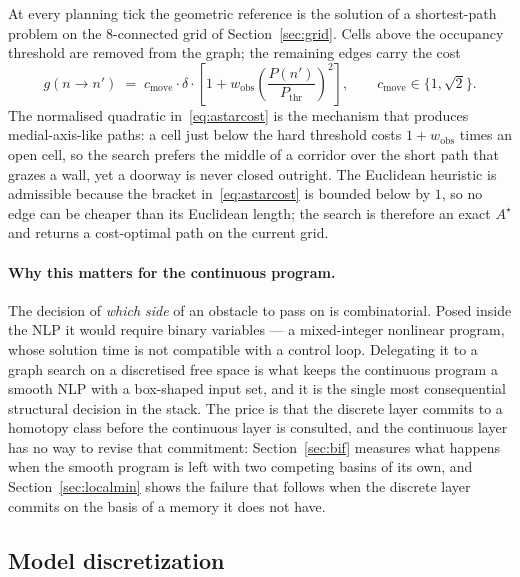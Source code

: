 \documentclass[11pt,a4paper]{article}
\newcommand{\astar}{$A^\star$}
\begin{document}
At every planning tick the geometric reference is the solution of a shortest-path problem on the
$8$-connected grid of Section~\ref{sec:grid}. Cells above the occupancy threshold are removed from the graph;
the remaining edges carry the cost
\begin{equation}
  g(n\rightarrow n') \;=\; c_{\mathrm{move}}\cdot\delta\cdot
  \left[1+w_{\mathrm{obs}}\left(\frac{P(n')}{P_{\mathrm{thr}}}\right)^{\!2}\right],
  \qquad c_{\mathrm{move}}\in\{1,\sqrt2\}.
  \label{eq:astarcost}
\end{equation}
The normalised quadratic in~\eqref{eq:astarcost} is the mechanism that produces medial-axis-like paths: a
cell just below the hard threshold costs $1+w_{\mathrm{obs}}$ times an open cell, so the search prefers the
middle of a corridor over the short path that grazes a wall, yet a doorway is never closed outright. The
Euclidean heuristic is admissible because the bracket in~\eqref{eq:astarcost} is bounded below by $1$, so no
edge can be cheaper than its Euclidean length; the search is therefore an exact \astar{} and returns a
cost-optimal path on the current grid.

\paragraph{Why this matters for the continuous program.} The decision of \emph{which side} of an obstacle to
pass on is combinatorial. Posed inside the NLP it would require binary variables --- a mixed-integer
nonlinear program, whose solution time is not compatible with a control loop. Delegating it to a graph search
on a discretised free space is what keeps the continuous program a smooth NLP with a box-shaped input set,
and it is the single most consequential structural decision in the stack. The price is that the discrete
layer commits to a homotopy class before the continuous layer is consulted, and the continuous layer has no
way to revise that commitment: Section~\ref{sec:bif} measures what happens when the smooth program is left
with two competing basins of its own, and Section~\ref{sec:localmin} shows the failure that follows when the
discrete layer commits on the basis of a memory it does not have.

\subsection{Model discretization}
\label{sec:discretization}
\end{document}
